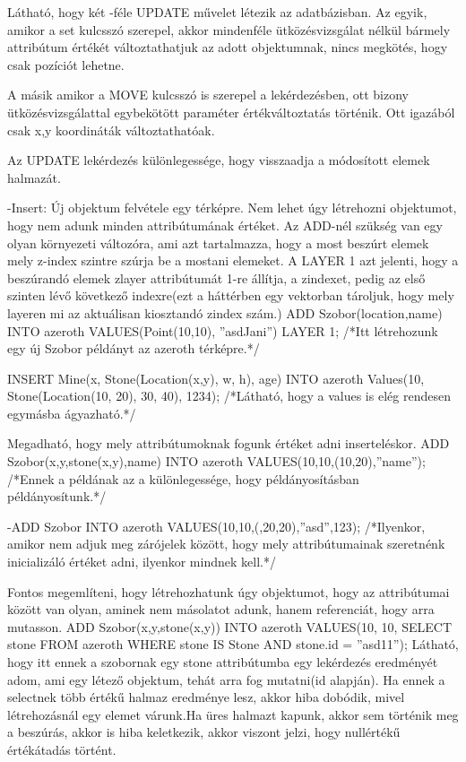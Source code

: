 Látható, hogy két -féle UPDATE művelet létezik az adatbázisban. Az egyik, amikor a set kulcsszó szerepel, akkor mindenféle ütközésvizsgálat nélkül bármely attribútum értékét változtathatjuk az adott objektumnak, nincs megkötés, hogy csak pozíciót lehetne.

A másik amikor a MOVE kulcsszó is szerepel a lekérdezésben, ott bizony ütközésvizsgálattal egybekötött paraméter értékváltoztatás történik. Ott igazából  csak x,y koordináták változtathatóak.

Az UPDATE lekérdezés különlegessége, hogy visszaadja a módosított elemek halmazát.

-Insert: Új objektum felvétele egy térképre. 
Nem lehet úgy létrehozni objektumot, hogy nem adunk minden attribútumának értéket.
Az ADD-nél szükség van egy olyan környezeti változóra, ami azt tartalmazza, hogy a most beszúrt elemek mely z-index szintre szúrja be a mostani elemeket.
A LAYER 1 azt jelenti, hogy a beszúrandó elemek zlayer attribútumát 1-re állítja, a zindexet, pedig az első szinten lévő következő indexre(ezt a háttérben egy vektorban tároljuk, hogy mely layeren mi az aktuálisan kiosztandó zindex szám.)
ADD Szobor(location,name) INTO azeroth VALUES(Point(10,10), ”asdJani”) LAYER 1; /*Itt létrehozunk egy új Szobor példányt az azeroth térképre.*/

INSERT Mine(x, Stone(Location(x,y), w, h), age) INTO azeroth Values(10, Stone(Location(10, 20), 30, 40), 1234); /*Látható, hogy a values is elég rendesen egymásba ágyazható.*/

Megadható, hogy mely attribútumoknak fogunk értéket adni inserteléskor.
ADD Szobor(x,y,stone(x,y),name) INTO azeroth VALUES(10,10,(10,20),”name”);
/*Ennek a példának az a különlegessége, hogy példányosításban példányosítunk.*/

-ADD Szobor INTO azeroth VALUES(10,10,(,20,20),”asd”,123);  /*Ilyenkor, amikor nem adjuk meg zárójelek között, hogy mely attribútumainak szeretnénk inicializáló értéket adni, ilyenkor mindnek kell.*/

Fontos megemlíteni, hogy létrehozhatunk úgy objektumot, hogy az attribútumai között van olyan, aminek nem másolatot adunk, hanem referenciát, hogy arra mutasson.
ADD Szobor(x,y,stone(x,y)) INTO azeroth VALUES(10, 10, SELECT stone FROM azeroth WHERE stone IS Stone AND stone.id = ”asd11”);
Látható, hogy itt ennek a szobornak egy stone attribútumba egy lekérdezés eredményét adom, ami egy létező objektum, tehát arra fog mutatni(id alapján).
Ha ennek a selectnek több értékű halmaz eredménye lesz, akkor hiba dobódik, mivel létrehozásnál egy elemet várunk.Ha üres halmazt kapunk, akkor sem történik meg a beszúrás, akkor is hiba keletkezik, akkor viszont jelzi, hogy nullértékű értékátadás történt.

